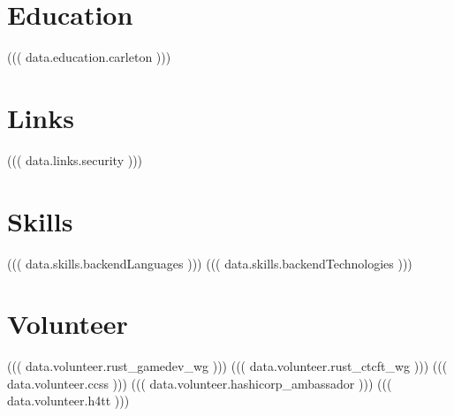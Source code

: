 \documentclass[]{deedy-resume-openfont}
\begin{document}
\vspace*{10pt}


%
%

\begin{minipage}[t]{0.33\textwidth}

\section{Education}

((( data.education.carleton )))

\section{Links}

((( data.links.security )))

\section{Skills}

((( data.skills.backendLanguages )))
((( data.skills.backendTechnologies )))

\section{Volunteer}

((( data.volunteer.rust_gamedev_wg )))
((( data.volunteer.rust_ctcft_wg )))
((( data.volunteer.ccss )))
((( data.volunteer.hashicorp_ambassador )))
((( data.volunteer.h4tt )))

%
%

\end{minipage} 
\hfill
\end{document}
